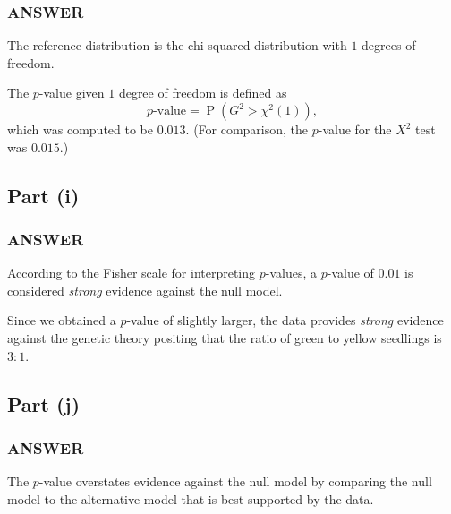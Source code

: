 \documentclass[
]{article}
\begin{document}

\hypertarget{answer-7}{%
\subsubsection{ANSWER}\label{answer-7}}

The reference distribution is the chi-squared distribution with \(1\)
degrees of freedom.

The \(p\)-value given \(1\) degree of freedom is defined as \[
  \text{$p$-value} = \operatorname{P}(G^2 > \chi^2(1)),
\] which was computed to be \(0.013\). (For comparison, the \(p\)-value
for the \(X^2\) test was \(0.015\).)

\hypertarget{part-i}{%
\subsection{Part (i)}\label{part-i}}


\hypertarget{answer-8}{%
\subsubsection{ANSWER}\label{answer-8}}

According to the Fisher scale for interpreting \(p\)-values, a
\(p\)-value of \(0.01\) is considered \emph{strong} evidence against the
null model.

Since we obtained a \(p\)-value of slightly larger, the data provides
\emph{strong} evidence against the genetic theory positing that the
ratio of green to yellow seedlings is \(3:1\).

\hypertarget{part-j}{%
\subsection{Part (j)}\label{part-j}}


\hypertarget{answer-9}{%
\subsubsection{ANSWER}\label{answer-9}}

The \(p\)-value overstates evidence against the null model by comparing
the null model to the alternative model that is best supported by the
data.
\end{document}
